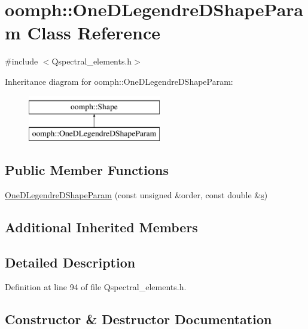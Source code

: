 \hypertarget{classoomph_1_1OneDLegendreDShapeParam}{}\section{oomph\+:\+:One\+D\+Legendre\+D\+Shape\+Param Class Reference}
\label{classoomph_1_1OneDLegendreDShapeParam}


{\ttfamily \#include $<$Qspectral\+\_\+elements.\+h$>$}

Inheritance diagram for oomph\+:\+:One\+D\+Legendre\+D\+Shape\+Param\+:\begin{figure}[H]
\begin{center}
\leavevmode
\includegraphics[height=2.000000cm]{classoomph_1_1OneDLegendreDShapeParam}
\end{center}
\end{figure}
\subsection*{Public Member Functions}
\begin{DoxyCompactItemize}
\item 
\hyperlink{classoomph_1_1OneDLegendreDShapeParam_a5846c7ee2a20a714b74520922bef2e02}{One\+D\+Legendre\+D\+Shape\+Param} (const unsigned \&order, const double \&\hyperlink{cfortran_8h_ab7123126e4885ef647dd9c6e3807a21c}{s})
\end{DoxyCompactItemize}
\subsection*{Additional Inherited Members}


\subsection{Detailed Description}


Definition at line 94 of file Qspectral\+\_\+elements.\+h.



\subsection{Constructor \& Destructor Documentation}
\mbox{\label{classoomph_1_1OneDLegendreDShapeParam_a5846c7ee2a20a714b74520922bef2e02}} 
